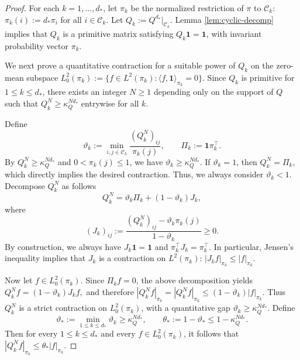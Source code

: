 \documentclass[11pt,twoside, a4paper]{article}
\numberwithin{equation}{section}
\numberwithin{figure}{section}
\theoremstyle{plain} %
\theoremstyle{definition}
\theoremstyle{remark}
\newcommand{\1} {\mspace{1 mu}}
\newcommand{\2} {\mspace{2 mu}}
\begin{document}
\begin{proof}
For each \(k=1,\dots,d_*\), let \(\pi_k\) be the normalized restriction of \(\pi\) to \(\mathcal{C}_{k}\):
$\pi_k(i):=d_*\pi_i$ for all $i\in \mathcal{C}_{k}$.
Let $Q_k:=Q^{d_*}|_{\mathcal{C}_{k}}$. Lemma \ref{lem:cyclic-decomp} implies that \(Q_k\) is a primitive matrix satisfying $Q_k\mathbf{1}=\mathbf{1}$, with invariant probability vector \(\pi_k\). 

We next prove a quantitative contraction for a suitable power of \(Q_k\) on the zero-mean subspace
$
L_0^2(\pi_k):=\{f\in L^2(\pi_k): \langle f,\mathbf 1\rangle_{\pi_k}=0\}.
$
Since \(Q_k\) is primitive for $1\le k\le d_*$, there exists an integer \( N\ge 1\) depending only on the support of \(Q\) such that
$
Q_k^{N}\ge \kappa_Q^{Nd_*}
$
entrywise for all \(k\). 

Define
\[
\vartheta_k:=\min_{i,j\in \mathcal C_k}\frac{(Q_k^{N})_{ij}}{\pi_k(j)},\qquad \Pi_k:=\mathbf{1}\pi_k^\top.
\]
By \(Q^N_k\ge\kappa_Q^{Nd_*}\) and \(0<\pi_k(j)\le 1\), we have $\vartheta_k\ge \kappa_Q^{Nd_*}$. 
If $\vartheta_k=1$, then $Q_k^N=\Pi_k$, which directly implies the desired contraction. Thus, we always consider $\vartheta_k<1$.
Decompose $Q_k^{N}$ as follows
\[
Q_k^{N}=\vartheta_k \Pi_k+(1-\vartheta_k)J_k,
\]
where
\[
(J_k)_{ij}:=\frac{(Q_k^{N})_{ij}-\vartheta_k\pi_k(j)}{1-\vartheta_k}\ge 0.
\]
By construction, we always have $J_k\mathbf{1}=\mathbf{1}$ and  $\pi_k^\top J_k=\pi_k^\top$.
In particular, Jensen's inequality implies that \(J_k\) is a contraction on \(L^2(\pi_k)\):
$
|J_k f|_{\pi_k}\le |f|_{\pi_k}
$.

Now let \(f\in L_0^2(\pi_k)\). Since \(\Pi_k f=0\), the above decomposition yields
$
Q_k^{N} f=(1-\vartheta_k)J_k f,
$
and therefore
$
|Q_k^N f|_{\pi_k}
=
|Q_k^{N} f|_{\pi_k}
\le
(1-\vartheta_k)|f|_{\pi_k}.
$
Thus \(Q_k^N\) is a strict contraction on \(L_0^2(\pi_k)\), with a quantitative gap
$
\vartheta_k\ge\kappa_Q^{Nd_*}.
$
Define
\[
\vartheta_*:=\min_{1\le k\le d_*}\vartheta_k\ge\kappa_Q^{Nd_*},
\qquad
\theta_*:=1-\vartheta_*\le 1-\kappa_Q^{Nd_*}.
\]
Then for every \(1\le k\le d_*\) and every \(f\in L_0^2(\pi_k)\), it follows that
$
|Q_k^N f|_{\pi_k}\le \theta_* |f|_{\pi_k}.
$


\end{proof}
\end{document}
